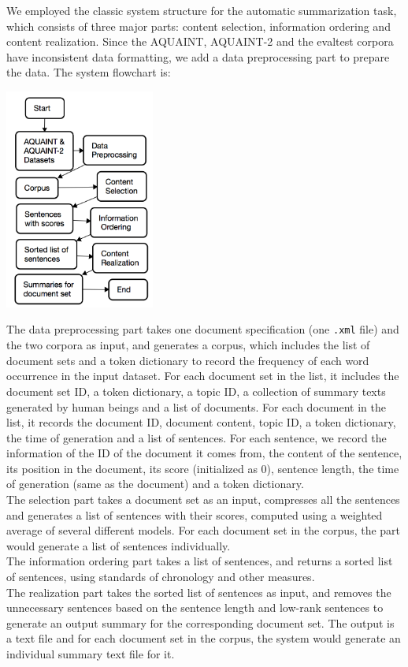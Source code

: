 \documentclass[11pt]{article}
\begin{document}
We employed the classic system structure for the automatic summarization task, which consists of three major parts: content selection, information ordering and content realization. Since the AQUAINT, AQUAINT-2 and the evaltest corpora have inconsistent data formatting, we add a data preprocessing part to prepare the data. The system flowchart is: \\
\begin{center}
\includegraphics[width=0.37\textwidth]{flowchart.png}
\end{center}
\indent
The data preprocessing part takes one document specification (one \texttt{.xml} file) and the two corpora as input, and generates a corpus, which includes the list of document sets and a token dictionary to record the frequency of each word occurrence in the input dataset. For each document set in the list, it includes the document set ID, a token dictionary, a topic ID, a collection of summary texts generated by human beings and a list of documents. For each document in the list, it records the document ID, document content, topic ID, a token dictionary, the time of generation and a list of sentences. For each sentence, we record the information of the ID of the document it comes from, the content of the sentence, its position in the document, its score (initialized as 0), sentence length, the time of generation (same as the document) and a token dictionary.\\
\indent
The selection part takes a document set as an input, compresses all the sentences and generates a list of sentences with their scores, computed using a weighted average of several different models. For each document set in the corpus, the part would generate a list of sentences individually.\\
\indent
The information ordering part takes a list of sentences, and returns a sorted list of sentences, using standards of chronology and other measures. \\
\indent
The realization part takes the sorted list of sentences as input, and removes the unnecessary sentences based on the sentence length and low-rank sentences to generate an output summary for the corresponding document set. The output is a text file and for each document set in the corpus, the system would generate an individual summary text file for it.
\end{document}
